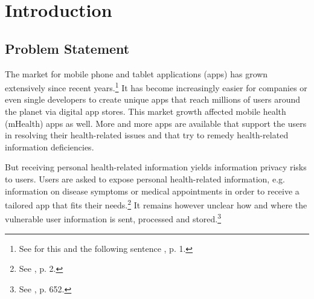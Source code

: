 \section{Introduction}

\subsection{Problem Statement}

The market for mobile phone and tablet applications (apps) has grown extensively since recent years.\footnote{See for this and the following sentence \cite{Enck2011}, p. 1.}
It has become increasingly easier for companies or even single developers to create unique apps that reach millions of users around the planet via digital app stores.
This market growth affected mobile health (\acs{mHealth}) apps as well. 
More and more \mH apps are available that support the users in resolving their health-related issues and that try to remedy health-related information deficiencies. 

But receiving personal health-related information yields information privacy risks to users.
Users are asked to expose personal health-related information, e.g. information on disease symptoms or medical appointments in order to receive a tailored app that fits their needs.\footnote{See \cite{Chen2012}, p. 2.}
It remains however unclear how and where the vulnerable user information is sent, processed and stored.\footnote{See \cite{He2014}, p. 652.}

